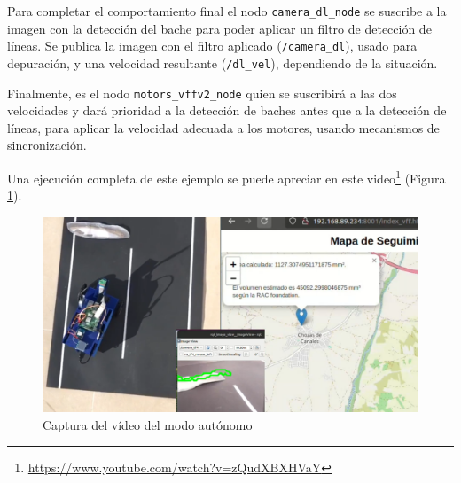 Para completar el comportamiento final el nodo \verb|camera_dl_node| se suscribe a la imagen con la detección del bache para poder aplicar un filtro de detección de líneas. Se publica la imagen con el filtro aplicado (\verb|/camera_dl|), usado para depuración, y una velocidad resultante (\verb|/dl_vel|), dependiendo de la situación.

Finalmente, es el nodo \verb|motors_vffv2_node| quien se suscribirá a las dos velocidades y dará prioridad a la detección de baches antes que a la detección de líneas, para aplicar la velocidad adecuada a los motores, usando mecanismos de sincronización.

Una ejecución completa de este ejemplo se puede apreciar en este video\footnote{\url{https://www.youtube.com/watch?v=zQudXBXHVaY}} (Figura \ref{fig:expvfffinal}). 

\begin{figure} [h!]
	\begin{center}
		\includegraphics[width=15cm]{figs/cap7/autonomo_final.png}
	\end{center}
	\caption{Captura del vídeo del modo autónomo}
	\label{fig:expvfffinal}
\end{figure}

